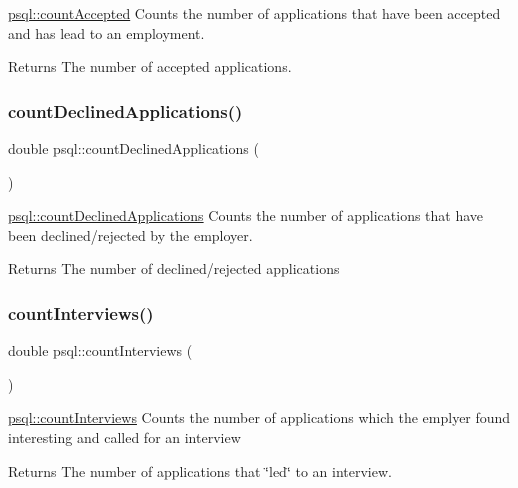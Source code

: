 \mbox{\hyperlink{classpsql_a0beec2f098edc0961f27774cdd54d09b}{psql\+::count\+Accepted}} Counts the number of applications that have been accepted and has lead to an employment. 

\begin{DoxyReturn}{Returns}
The number of accepted applications. 
\end{DoxyReturn}
\mbox{\label{classpsql_a40541367c3af9c0ac94e2fb92f00f53c}} 
\subsubsection{\texorpdfstring{count\+Declined\+Applications()}{countDeclinedApplications()}}
{\footnotesize\ttfamily double psql\+::count\+Declined\+Applications (\begin{DoxyParamCaption}{ }\end{DoxyParamCaption})}



\mbox{\hyperlink{classpsql_a40541367c3af9c0ac94e2fb92f00f53c}{psql\+::count\+Declined\+Applications}} Counts the number of applications that have been declined/rejected by the employer. 

\begin{DoxyReturn}{Returns}
The number of declined/rejected applications 
\end{DoxyReturn}
\mbox{\label{classpsql_a84c1fdea2d09783a39677c4f79d924fc}} 
\subsubsection{\texorpdfstring{count\+Interviews()}{countInterviews()}}
{\footnotesize\ttfamily double psql\+::count\+Interviews (\begin{DoxyParamCaption}{ }\end{DoxyParamCaption})}



\mbox{\hyperlink{classpsql_a84c1fdea2d09783a39677c4f79d924fc}{psql\+::count\+Interviews}} Counts the number of applications which the emplyer found interesting and called for an interview 

\begin{DoxyReturn}{Returns}
The number of applications that \char`\"{}led\char`\"{} to an interview. 
\end{DoxyReturn}
\mbox{\label{classpsql_a8673a80968d293cd3ead6e6e9da8dd8a}} 
